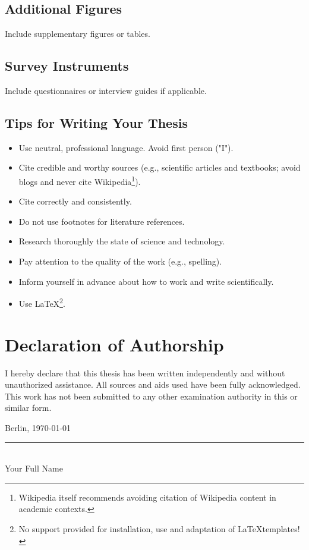 \documentclass[oneside,12pt]{book}
\begin{document}
\section{Additional Figures}
Include supplementary figures or tables.

\section{Survey Instruments}
Include questionnaires or interview guides if applicable.


\section{Tips for Writing Your Thesis}

\begin{itemize}
\item Use neutral, professional language. Avoid first person ("I").
\item Cite credible and worthy sources (e.g., scientific articles and textbooks; avoid blogs and never cite Wikipedia\footnote{Wikipedia itself recommends avoiding citation of Wikipedia content in academic contexts.}).
\item Cite correctly and consistently.
\item Do not use footnotes for literature references.
\item Research thoroughly the state of science and technology.
\item Pay attention to the quality of the work (e.g., spelling).
\item Inform yourself in advance about how to work and write scientifically.
\item Use \LaTeX\footnote{No support provided for installation, use and adaptation of \LaTeX templates!}.
\end{itemize}

\backmatter

\chapter*{Declaration of Authorship}

I hereby declare that this thesis has been written independently and without unauthorized assistance. All sources and aids used have been fully acknowledged. This work has not been submitted to any other examination authority in this or similar form.

\vspace{2cm}
\noindent Berlin, \today

\vspace{1.5cm}
\noindent\rule{6cm}{0.4pt}\\
Your Full Name
\end{document}
